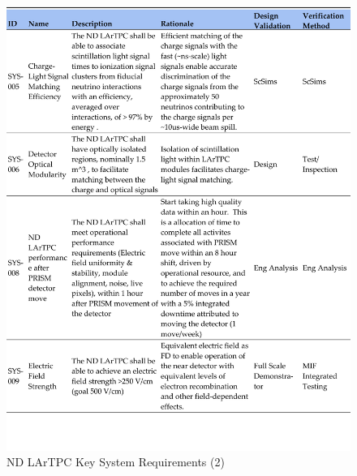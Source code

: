 \begin{figure}
\centering 
\includegraphics[width=1\linewidth]{graphics/lartpc/0Req/NDreqs2.pdf}
\caption{\label{fig:lartpcreq2} ND LArTPC Key System Requirements (2)}
\end{figure}
